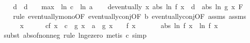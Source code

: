 \begin{isabellebody}
\ \ \isamarkupfalse%
\ d\ \ {\isachardoublequoteopen}d\ {\isacharequal}{\kern0pt}\ {}\ {\isacharplus}{\kern0pt}\ {\isacharparenleft}{\kern0pt}max\ {}\ {\isacharparenleft}{\kern0pt}ln\ c{\isacharparenright}{\kern0pt}{\isacharparenright}{\kern0pt}\ {\isacharslash}{\kern0pt}\ ln\ a{\isachardoublequoteclose}\isanewline
\ \ \isamarkupfalse%
\ d{\isacharcolon}{\kern0pt}{\isachardoublequoteopen}eventually\ {\isacharparenleft}{\kern0pt}{\isasymlambda}x{\isachardot}{\kern0pt}\ abs\ {\isacharparenleft}{\kern0pt}ln\ {\isacharparenleft}{\kern0pt}f\ x{\isacharparenright}{\kern0pt}{\isacharparenright}{\kern0pt}\ {\isasymle}\ d\ {\isacharasterisk}{\kern0pt}\ abs\ {\isacharparenleft}{\kern0pt}ln\ {\isacharparenleft}{\kern0pt}g\ x{\isacharparenright}{\kern0pt}{\isacharparenright}{\kern0pt}{\isacharparenright}{\kern0pt}\ F{\isacharprime}{\kern0pt}{\isachardoublequoteclose}\isanewline
\ \ \isamarkupfalse%
\ {\isacharparenleft}{\kern0pt}rule\ eventually{\isacharunderscore}{\kern0pt}mono{\isacharbrackleft}{\kern0pt}OF\ eventually{\isacharunderscore}{\kern0pt}conj{\isacharbrackleft}{\kern0pt}OF\ b\ eventually{\isacharunderscore}{\kern0pt}conj{\isacharbrackleft}{\kern0pt}OF\ assms{\isacharparenleft}{\kern0pt}{}{\isacharparenright}{\kern0pt}\ assms{\isacharparenleft}{\kern0pt}{}{\isacharparenright}{\kern0pt}{\isacharbrackright}{\kern0pt}{\isacharbrackright}{\kern0pt}{\isacharbrackright}{\kern0pt}{\isacharparenright}{\kern0pt}\isanewline
\ \ \ \ \isamarkupfalse%
\ x\isanewline
\ \ \ \ \isamarkupfalse%
\ c{\isacharcolon}{\kern0pt}{\isachardoublequoteopen}{\isasymbar}f\ x{\isasymbar}\ {\isasymle}\ c\ {\isacharasterisk}{\kern0pt}\ {\isasymbar}g\ x{\isasymbar}\ {\isasymand}\ a\ {\isasymle}\ g\ x\ {\isasymand}\ {}\ {\isasymle}\ f\ x{\isachardoublequoteclose}\ \isanewline
\ \ \ \ \isamarkupfalse%
\ {\isachardoublequoteopen}abs\ {\isacharparenleft}{\kern0pt}ln\ {\isacharparenleft}{\kern0pt}f\ x{\isacharparenright}{\kern0pt}{\isacharparenright}{\kern0pt}\ {\isacharequal}{\kern0pt}\ ln\ {\isacharparenleft}{\kern0pt}f\ x{\isacharparenright}{\kern0pt}{\isachardoublequoteclose}\isanewline
\ \ \ \ \ \ \isamarkupfalse%
\ {\isacharparenleft}{\kern0pt}subst\ abs{\isacharunderscore}{\kern0pt}of{\isacharunderscore}{\kern0pt}nonneg{\isacharcomma}{\kern0pt}\ rule\ ln{\isacharunderscore}{\kern0pt}ge{\isacharunderscore}{\kern0pt}zero{\isacharcomma}{\kern0pt}\ metis\ c{\isacharcomma}{\kern0pt}\ simp{\isacharparenright}{\kern0pt}\isanewline

\end{isabellebody}
